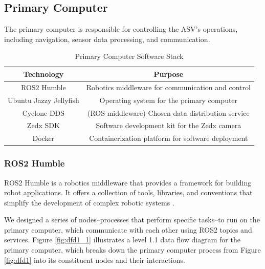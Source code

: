 \subsection{Primary Computer}
The primary computer is responsible for controlling the ASV's operations, including navigation, sensor data processing, and communication. 

\begin{table}[H]
    \centering
    \begin{tabular}{|c|c|}
        \hline
        \textbf{Technology} & \textbf{Purpose} \\
        \hline
        ROS2 Humble & Robotics middleware for communication and control \\
        \hline
        Ubuntu Jazzy Jellyfish & Operating system for the primary computer \\
        \hline
        Cyclone DDS & (ROS middleware) Chosen data distribution service\footnotemark \\
        \hline
        Zedx SDK & Software development kit for the Zedx camera \\
        \hline
        Docker & Containerization platform for software deployment \\
        \hline
    \end{tabular}
    \caption{Primary Computer Software Stack}
    \label{tab:primary-computer-software}
\end{table}

\subsubsection{ROS2 Humble}
ROS2 Humble is a robotics middleware that provides a framework for building robot applications.
It offers a collection of tools, libraries, and conventions that simplify the development of complex robotic systems \autocite{ROS2Humble}.

We designed a series of nodes--processes that perform specific tasks--to run on the primary computer, which communicate with each other using ROS2 topics and services.
Figure \ref{fig:dfd1_1} illustrates a level 1.1 data flow diagram for the primary computer, which breaks down the primary computer process from Figure \ref{fig:dfd1} into its constituent nodes and their interactions.

